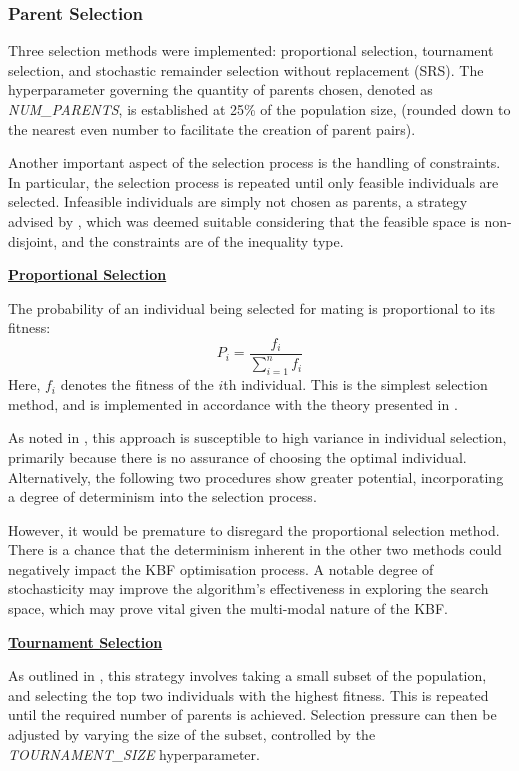\documentclass[10pt]{article}
\begin{document}
\begin{multicols}{2}
\subsubsection{Parent Selection}
\label{sec:CGA_parent_selection}

Three selection methods were implemented: proportional selection, tournament selection, and stochastic remainder selection without replacement (SRS). The hyperparameter governing the quantity of parents chosen, denoted as \textit{NUM\_PARENTS}, is established at 25\% of the population size, (rounded down to the nearest even number to facilitate the creation of parent pairs).

Another important aspect of the selection process is the handling of constraints. In particular, the selection process is repeated until only feasible individuals are selected. Infeasible individuals are simply not chosen as parents, a strategy advised by \cite{parks2023geneticalgorithms}, which was deemed suitable considering that the feasible space is non-disjoint, and the constraints are of the inequality type.

\textbf{\underline{Proportional Selection}}

The probability of an individual being selected for mating is proportional to its fitness:
\[
    P_i = \frac{f_i}{\sum_{i=1}^{n} f_i}
\]
Here, \(f_i\) denotes the fitness of the \(i\)th individual. This is the simplest selection method, and is implemented in accordance with the theory presented in \cite{parks2023geneticalgorithms}.

As noted in \cite{parks2023geneticalgorithms}, this approach is susceptible to high variance in individual selection, primarily because there is no assurance of choosing the optimal individual. Alternatively, the following two procedures show greater potential, incorporating a degree of determinism into the selection process.

However, it would be premature to disregard the proportional selection method. There is a chance that the determinism inherent in the other two methods could negatively impact the KBF optimisation process. A notable degree of stochasticity may improve the algorithm's effectiveness in exploring the search space, which may prove vital given the multi-modal nature of the KBF.

\textbf{\underline{Tournament Selection}}

As outlined in \cite{parks2023geneticalgorithms}, this strategy involves taking a small subset of the population, and selecting the top two individuals with the highest fitness. This is repeated until the required number of parents is achieved. Selection pressure can then be adjusted by varying the size of the subset, controlled by the \textit{TOURNAMENT\_SIZE} hyperparameter.


\end{multicols}
\end{document}
